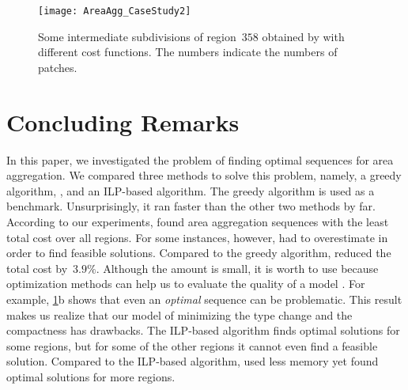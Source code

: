 \begin{figure}[h!tb]
\centering
\texttt{[image: AreaAgg\_CaseStudy2]}
\caption{Some intermediate subdivisions of region~$358$ 
	obtained by \Astar with different cost functions.
	The numbers indicate the numbers of patches.
}
\label{fig:AreaAgg_CaseStudy2_Rg358}
\end{figure}



\section{Concluding Remarks}
\label{sec:AreaAgg_Conclusions}
In this paper, we investigated the problem of 
finding optimal sequences for area aggregation.
We compared three methods to solve this problem, namely, 
a greedy algorithm, \Astar, and an ILP-based algorithm.
The greedy algorithm is used as a benchmark.
Unsurprisingly, it ran faster than the other two methods by far.
According to our experiments, \Astar found area aggregation 
sequences
with the least total cost over all regions.
For some instances, however, \Astar had to overestimate
in order to find feasible solutions.
Compared to the greedy algorithm, 
\Astar reduced the total cost by~$3.9\%$.
Although the amount is small, it is worth to use \Astar
because optimization methods can help us to evaluate the quality 
of a model \parencite{Haunert2017Label,Haunert2008Assuring,Haunert2016Optimization}.
For example, \fig\ref{fig:AreaAgg_CaseStudy2_Rg358}b shows that
even an \emph{optimal} sequence can be problematic. 
This result makes us realize that our model of minimizing the 
type change and the compactness has drawbacks.
The ILP-based algorithm finds optimal solutions for some regions,
but for some of the other regions 
it cannot even find a feasible solution.
Compared to the ILP-based algorithm,
\Astar used less memory 
yet found optimal solutions for more regions.


